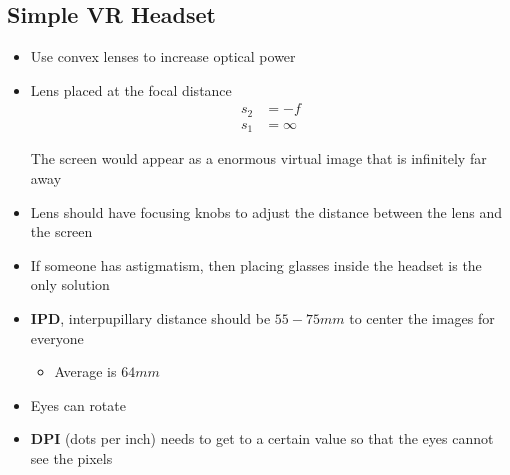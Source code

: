 \subsection{Simple VR Headset}

  \begin{itemize}
    \item Use convex lenses to increase optical power
    \item Lens placed at the focal distance
    \begin{align}
      s_{2} &= -f \\
      s_{1} &= \infty
    \end{align}

    The screen would appear as a enormous virtual image that is infinitely
    far away

    \item Lens should have focusing knobs to adjust the distance between
    the lens and the screen
    \item If someone has astigmatism, then placing glasses inside the headset
    is the only solution
    \item \textbf{IPD}, interpupillary distance should be $ 55-75mm $ to center
    the images for everyone
    \begin{itemize}
      \item Average is $ 64mm $
    \end{itemize}

    \item Eyes can rotate
    \item \textbf{DPI} (dots per inch) needs to get to a certain value so that
    the eyes cannot see the pixels
  \end{itemize}
